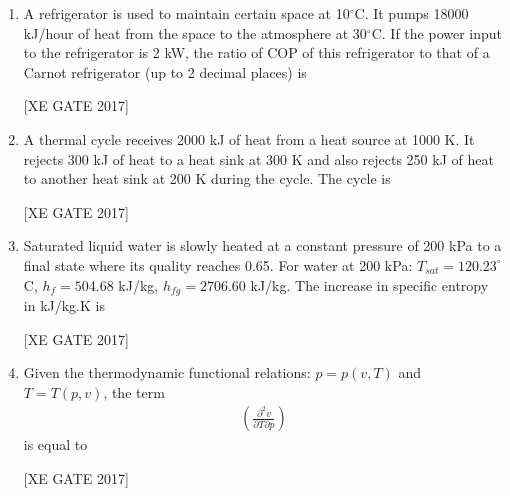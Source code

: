 \documentclass[journal,12pt,onecolumn]{IEEEtran}
\theoremstyle{remark}
\begin{document}
\begin{enumerate}
\item A refrigerator is used to maintain certain space at 10$^\circ$C. It pumps 18000 kJ/hour of heat from the space to the atmosphere at 30$^\circ$C. If the power input to the refrigerator is 2 kW, the ratio of COP of this refrigerator to that of a Carnot refrigerator (up to 2 decimal places) is  

\hfill [XE GATE 2017]


\item A thermal cycle receives 2000 kJ of heat from a heat source at 1000 K. It rejects 300 kJ of heat to a heat sink at 300 K and also rejects 250 kJ of heat to another heat sink at 200 K during the cycle. The cycle is  

\hfill [XE GATE 2017]

\begin{enumerate}
\end{enumerate}


\item Saturated liquid water is slowly heated at a constant pressure of 200 kPa to a final state where its quality reaches 0.65. For water at 200 kPa: $T_{sat} = 120.23^\circ$C, $h_f = 504.68$ kJ/kg, $h_{fg} = 2706.60$ kJ/kg. The increase in specific entropy in kJ/kg.K is  

\hfill [XE GATE 2017]

\begin{enumerate}
\end{enumerate}
\item Given the thermodynamic functional relations: $p = p(v,T)$ and $T = T(p,v)$, the term  
\begin{align}
    \left( \frac{\partial^2 v}{\partial T \partial p} \right)
\end{align}
is equal to  

\hfill [XE GATE 2017]


\end{enumerate}
\end{document}
